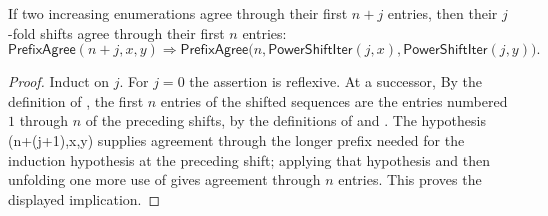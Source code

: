 \begin{lemma}
If two increasing enumerations agree through their first $n+j$ entries, then
their $j$-fold shifts agree through their first $n$ entries:
\[
\mathsf{PrefixAgree}(n+j,x,y)
\Longrightarrow
\mathsf{PrefixAgree}\bigl(n,\mathsf{PowerShiftIter}(j,x),
  \mathsf{PowerShiftIter}(j,y)\bigr).
\]
\end{lemma}
\begin{proof}
Induct on $j$.  For $j=0$ the assertion is reflexive.  At a successor,
By the definition of , the first $n$ entries of the shifted sequences are the entries numbered
$1$ through $n$ of the preceding shifts, by the definitions of
 and .  The hypothesis
(n+(j+1),x,y) supplies agreement through the longer
prefix needed for the induction hypothesis at the preceding shift; applying
that hypothesis and then unfolding one more use of  gives
agreement through $n$ entries.  This proves the displayed implication.
\end{proof}
